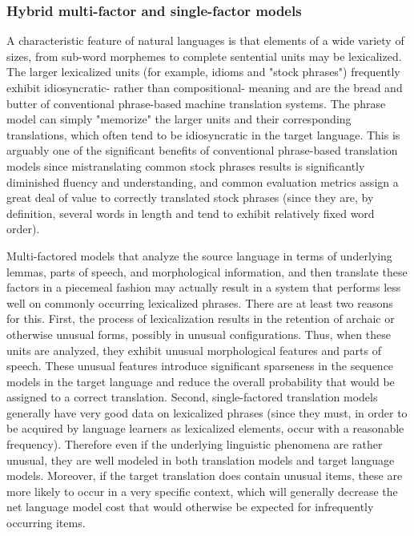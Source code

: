 \documentclass[11pt]{report}
\theoremstyle{plain}
\begin{document}
\subsubsection{Hybrid multi-factor and single-factor models}

A characteristic feature of natural languages is that elements of a
wide variety of sizes, from sub-word morphemes to complete
sentential units may be lexicalized.  The larger lexicalized units
(for example, idioms and "stock phrases") frequently exhibit
idiosyncratic- rather than compositional- meaning and are the bread
and butter of conventional phrase-based machine translation systems.
The phrase model can simply "memorize" the larger units and their
corresponding translations, which often tend to be idiosyncratic in
the target language.  This is arguably one of the significant
benefits of conventional phrase-based translation models since
mistranslating common stock phrases results is significantly
diminished fluency and understanding, and common evaluation metrics
assign a great deal of value to correctly translated stock phrases
(since they are, by definition, several words in length and tend to
exhibit relatively fixed word order).

Multi-factored models that analyze the source language in terms of
underlying lemmas, parts of speech, and morphological information,
and then translate these factors in a piecemeal fashion may actually
result in a system that performs less well on commonly occurring
lexicalized phrases. There are at least two reasons for this. First,
the process of lexicalization results in the retention of archaic or
otherwise unusual forms, possibly in unusual configurations.  Thus,
when these units are analyzed, they exhibit unusual morphological
features and parts of speech.  These unusual features introduce
significant sparseness in the sequence models in the target language
and reduce the overall probability that would be assigned to a
correct translation.  Second, single-factored translation models
generally have very good data on lexicalized phrases (since they
must, in order to be acquired by language learners as lexicalized
elements, occur with a reasonable frequency).  Therefore even if the
underlying linguistic phenomena are rather unusual, they are well
modeled in both translation models and target language models.
Moreover, if the target translation does contain unusual items,
these are more likely to occur in a very specific context, which
will generally decrease the net language model cost that would
otherwise be expected for infrequently occurring items.
\end{document}
